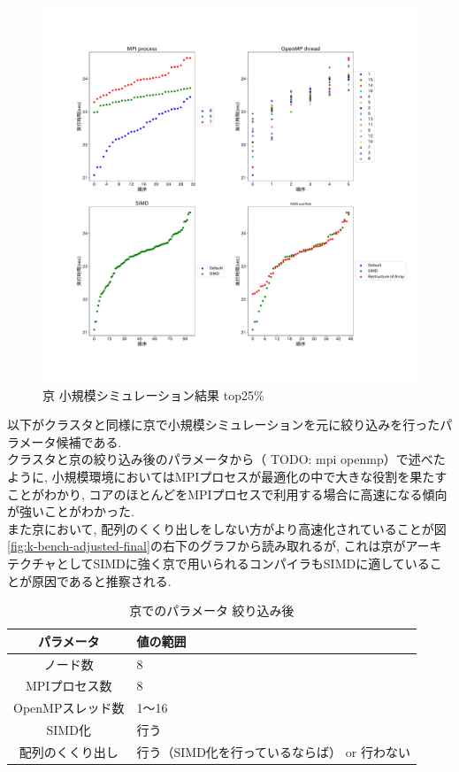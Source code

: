 \begin{figure}[htb]
\begin{center}
    \includegraphics[width=14cm]{./images/k-bench-top25.pdf}
    \caption{京 小規模シミュレーション結果 top25\%}
    \label{fig:k-bench-top25}
\end{center}
\end{figure}

以下がクラスタと同様に京で小規模シミュレーションを元に絞り込みを行ったパラメータ候補である.\\
クラスタと京の絞り込み後のパラメータから（ TODO: mpi openmp）で述べたように,
小規模環境においてはMPIプロセスが最適化の中で大きな役割を果たすことがわかり,
コアのほとんどをMPIプロセスで利用する場合に高速になる傾向が強いことがわかった.\\
また京において, 配列のくくり出しをしない方がより高速化されていることが図\ref{fig:k-bench-adjusted-final}の右下のグラフから読み取れるが,
これは京がアーキテクチャとしてSIMDに強く京で用いられるコンパイラもSIMDに適していることが原因であると推察される.
\begin{table}[htb]
  \caption {京でのパラメータ 絞り込み後}
  \begin{center}
    \begin{tabular}{|c|p{12cm}|}
      \hline
      パラメータ & 値の範囲\\ \hline
      ノード数 & 8\\ \hline
      MPIプロセス数 & 8\\ \hline
      OpenMPスレッド数 & 1〜16\\ \hline
      SIMD化 & 行う\\ \hline
      配列のくくり出し & 行う（SIMD化を行っているならば） or 行わない\\ \hline
    \end{tabular}
  \end{center}
\end{table}

